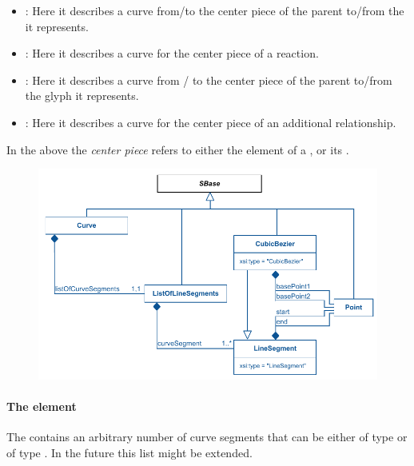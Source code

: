 \begin{itemize}

	\item {\SpeciesReferenceGlyph: Here it describes a curve from/to 
	the center piece of the parent \ReactionGlyph to/from the 
	\SpeciesGlyph it represents.}
	\item {\ReactionGlyph: Here it describes a curve for the 
	center piece of a reaction. }	
	\item {\ReferenceGlyph: Here it describes a curve from / to 
	the center piece of the parent \GeneralGlyph to/from the glyph 
	it represents.}
	\item {\GeneralGlyph: Here it describes a curve for the 
	center piece of an additional relationship. }	
	
\end{itemize}

In the above the \textit{center piece} refers to either the \Curve element of a \ReactionGlyph, or its \BoundingBox. 

\begin{figure}[!h]
\includegraphics{uml/layout-curve-uml}\\
\label{uml:curve}
\end{figure}

\paragraph{The  element} 
\label{listofcurvesegments-class} 

The  contains an arbitrary number of curve 
segments that can be either of type \LineSegment or of type 
\CubicBezier. In the future this list might be extended. 



